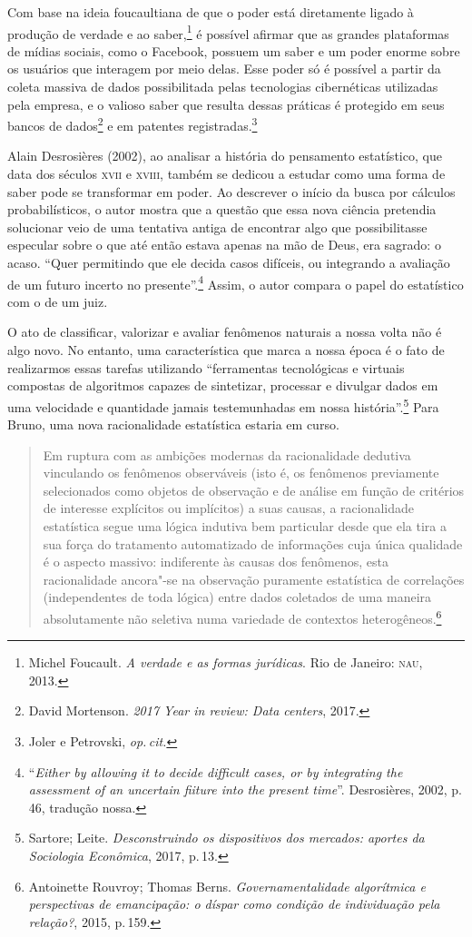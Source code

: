 Com base na ideia foucaultiana de que o poder está diretamente ligado à
produção de verdade e ao saber,\footnote{Michel Foucault. \emph{A verdade e as formas jurídicas}. Rio de Janeiro: \textsc{nau}, 2013.}
é possível afirmar que as grandes plataformas de mídias sociais, como o
Facebook, possuem um saber e um poder enorme sobre os usuários que
interagem por meio delas. Esse poder só é possível a partir da coleta
massiva de dados possibilitada pelas tecnologias cibernéticas utilizadas
pela empresa, e o valioso saber que resulta dessas práticas é protegido
em seus bancos de dados\footnote{David Mortenson. \emph{2017 Year in review: Data centers}, 2017.} e em patentes registradas.\footnote{Joler e Petrovski, \textit{op.\,cit.}}

Alain Desrosières (2002), ao analisar a história do pensamento estatístico, que data dos séculos
\textsc{xvii} e \textsc{xviii}, também se dedicou a estudar como uma forma de saber pode
se transformar em poder. Ao descrever o início da busca por cálculos
probabilísticos, o autor mostra que a questão que essa nova ciência
pretendia solucionar veio de uma tentativa antiga de encontrar algo que
possibilitasse especular sobre o que até então estava apenas na mão de
Deus, era sagrado: o acaso. ``Quer permitindo que ele decida casos
difíceis, ou integrando a avaliação de um futuro incerto no
presente''.\footnote{``\emph{Either by allowing it to decide difficult cases,
  or by integrating the assessment of an uncertain fiiture into the
  present time}''. Desrosières, 2002, p.\,46, tradução nossa.} Assim, o autor compara o papel
do estatístico com o de um juiz.

O ato de classificar, valorizar e avaliar fenômenos naturais a nossa
volta não é algo novo. No entanto, uma característica que marca a nossa
época é o fato de realizarmos essas tarefas utilizando ``ferramentas
tecnológicas e virtuais compostas de algoritmos capazes de sintetizar,
processar e divulgar dados em uma velocidade e quantidade jamais
testemunhadas em nossa história''.\footnote{Sartore; Leite. \emph{Desconstruindo os
dispositivos dos mercados: aportes da Sociologia Econômica}, 2017, p.\,13.} Para Bruno, uma nova racionalidade estatística estaria em curso.

\begin{quote}
Em ruptura com as ambições modernas da racionalidade dedutiva vinculando
os fenômenos observáveis (isto é, os fenômenos previamente selecionados
como objetos de observação e de análise em função de critérios de
interesse explícitos ou implícitos) a suas causas, a racionalidade
estatística segue uma lógica indutiva bem particular desde que ela tira
a sua força do tratamento automatizado de informações cuja única
qualidade é o aspecto massivo: indiferente às causas dos fenômenos, esta
racionalidade ancora"-se na observação puramente estatística de
correlações (independentes de toda lógica) entre dados coletados de uma
maneira absolutamente não seletiva numa variedade de contextos
heterogêneos.\footnote{Antoinette Rouvroy; Thomas Berns. \emph{Governamentalidade
algorítmica e perspectivas de emancipação: o díspar como condição de
individuação pela relação?}, 2015, p.\,159.}
\end{quote}

